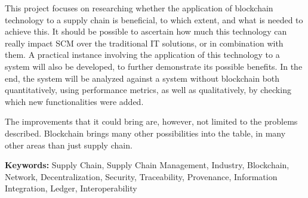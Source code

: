 This project focuses on researching whether the application of  blockchain technology to a supply chain is beneficial, to which extent, and what is needed to achieve this. It should be possible to ascertain how much this technology can really impact SCM over the traditional IT solutions, or in combination with them. A practical instance involving the application of this technology to a system will also be developed, to further demonstrate its possible benefits. In the end, the system will be analyzed against a system without blockchain both quantitatively, using performance metrics, as well as qualitatively, by checking which new functionalities were added.

The improvements that it could bring are, however, not limited to the problems described. Blockchain brings many other possibilities into the table, in many other areas than just supply chain.

\textbf{Keywords:} Supply Chain, Supply Chain Management, Industry, Blockchain, Network, Decentralization, Security, Traceability, Provenance, Information Integration, Ledger, Interoperability







